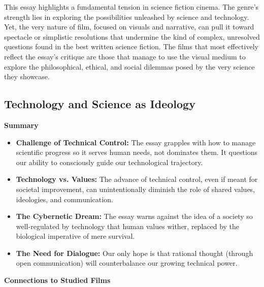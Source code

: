 \documentclass[11pt,fleqn]{book}
\begin{document}
\vspace{5pt}

This essay highlights a fundamental tension in science fiction cinema. The genre's strength lies in exploring the possibilities unleashed by science and technology. Yet, the very nature of film, focused on visuals and narrative, can pull it toward spectacle or simplistic resolutions that undermine the kind of complex, unresolved questions found in the best written science fiction. The films that most effectively reflect the essay's critique are those that manage to use the visual medium to explore the philosophical, ethical, and social dilemmas posed by the very science they showcase. 



\subsection{Technology and Science as Ideology}
\textbf{Summary}

\begin{itemize}
\item \textbf{Challenge of Technical Control:} The essay grapples with how to manage scientific progress so it serves human needs, not dominates them. It questions our ability to consciously guide our technological trajectory.  

\item \textbf{Technology vs. Values:}  The advance of technical control, even  if meant for societal improvement, can unintentionally diminish the role of shared values, ideologies, and communication.

\item \textbf{The Cybernetic Dream:} The essay warns against the idea of a society so well-regulated by technology that human values wither, replaced by the biological imperative of mere survival. 

\item \textbf{The Need for Dialogue:}  Our only hope is that rational thought (through open communication) will counterbalance our growing technical power. 
\end{itemize}
\vspace{5pt}
\textbf{Connections to Studied Films}
\end{document}
